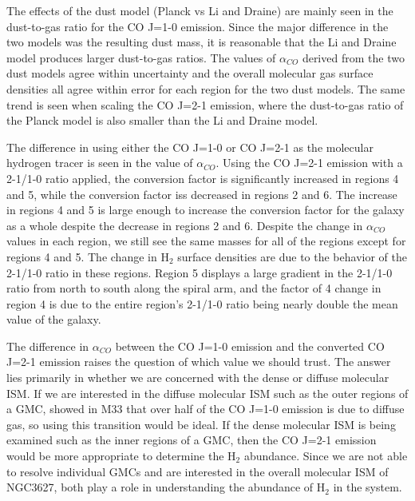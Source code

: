 The effects of the dust model (Planck vs Li and Draine) are mainly seen in the dust-to-gas ratio for the CO J=1-0 emission.  Since the major difference in the two models was the resulting dust mass, it is reasonable that the Li and Draine model produces larger dust-to-gas ratios.  The values of $\alpha_{CO}$ derived from the two dust models agree within uncertainty and the overall molecular gas surface densities all agree within error for each region for the two dust models.  The same trend is seen when scaling the CO J=2-1 emission, where the dust-to-gas ratio of the Planck model is also smaller than the Li and Draine model.  %
  
  The difference in using either the CO J=1-0 or CO J=2-1 as the molecular hydrogen tracer is seen in the value of $\alpha_{CO}$.  Using the CO J=2-1 emission with a 2-1/1-0 ratio applied, the conversion factor is significantly increased in regions 4 and 5, while the conversion factor iss decreased in regions 2 and 6.  The increase in regions 4 and 5 is large enough to increase the conversion factor for the galaxy as a whole despite the decrease in regions 2 and 6.  Despite the change in $\alpha_{CO}$ values in each region, we still see the same masses for all of the regions except for regions 4 and 5.  The change in H$_2$ surface densities are due to the behavior of the 2-1/1-0 ratio in these regions.  Region 5 displays a large gradient in the 2-1/1-0 ratio from north to south along the spiral arm, and the factor of 4 change in region 4 is due to the entire region's 2-1/1-0 ratio being nearly double the mean value of the galaxy. 
  
The difference in $\alpha_{CO}$ between the CO J=1-0 emission and the converted CO J=2-1 emission raises the question of which value we should trust.  The answer lies primarily in whether we are concerned with the dense or diffuse molecular ISM.  If we are interested in the diffuse molecular ISM such as the outer regions of a GMC, \cite{wilson1990} showed in M33 that over half of the CO J=1-0 emission is due to diffuse gas, so using this transition would be ideal.  If the dense molecular ISM is being examined such as the inner regions of a GMC, then the CO J=2-1 emission would be more appropriate to determine the H$_2$ abundance.  Since we are not able to resolve individual GMCs and are interested in the overall molecular ISM of NGC3627, both play a role in understanding the abundance of H$_2$ in the system.

